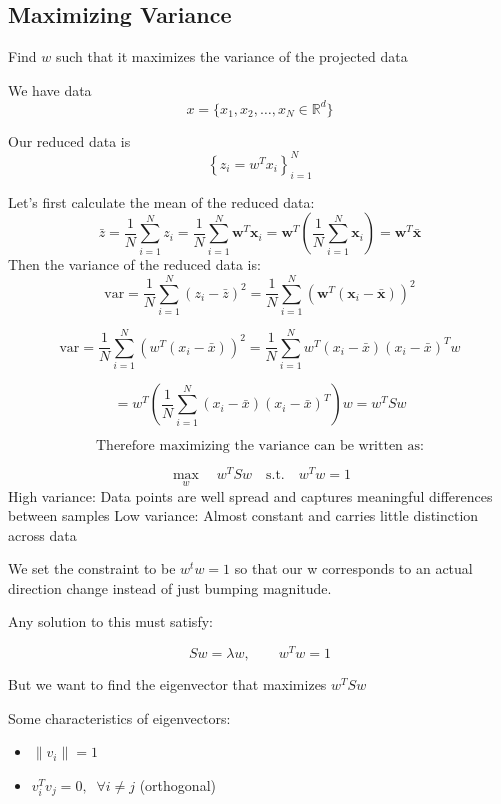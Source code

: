 \documentclass[11pt]{article}
\begin{document}
\subsection*{Maximizing Variance}

Find $w$ such that it maximizes the variance of the projected data

We have data
\[
	x = \{x_1, x_2,\dots, x_N\in \mathbb{R}^d\}
\]

Our reduced data is
\[
	\left\{ z_i =w^Tx_i \right\}_{i=1}^{N}
\]


Let’s first calculate the mean of the reduced data:
\[
	\bar{z} = \frac{1}{N} \sum_{i=1}^{N} z_i
	= \frac{1}{N} \sum_{i=1}^{N} \mathbf{w}^T \mathbf{x}_i
	= \mathbf{w}^T \left( \frac{1}{N} \sum_{i=1}^{N} \mathbf{x}_i \right)
	= \mathbf{w}^T \bar{\mathbf{x}}
\]
Then the variance of the reduced data is:
\[
	\mathrm{var} = \frac{1}{N} \sum_{i=1}^{N} (z_i - \bar{z})^2
	= \frac{1}{N} \sum_{i=1}^{N} \left( \mathbf{w}^T (\mathbf{x}_i - \bar{\mathbf{x}}) \right)^2
\]

\[
	\text{var} = \frac{1}{N} \sum_{i=1}^{N} \left(w^T(x_i - \bar{x})\right)^2
	= \frac{1}{N} \sum_{i=1}^{N} w^T(x_i - \bar{x})(x_i - \bar{x})^T w
\]

\[
	= w^T \left( \frac{1}{N} \sum_{i=1}^{N} (x_i - \bar{x})(x_i - \bar{x})^T \right) w
	= w^T S w
\]

\[
	\text{Therefore maximizing the variance can be written as:}
\]

\[
	\max_{w} \quad w^T S w \quad \text{s.t.} \quad w^T w = 1
\]
High variance: Data points are well spread and captures meaningful differences between samples
Low variance: Almost constant and carries little distinction across data

\medskip

We set the constraint to be $w^tw = 1$ so that our w corresponds to an actual direction change instead of just bumping magnitude.

Any solution to this must satisfy:

\[
	S w = \lambda w, \qquad w^T w = 1
\]

\medskip

But we want to find the eigenvector that maximizes $w^T S w$

\pagebreak

Some characteristics of eigenvectors:
\begin{itemize}
	\item $\|v_i\| = 1$
	\item $v_i^T v_j = 0,\;\; \forall i \ne j$ \quad (orthogonal)
\end{itemize}
\end{document}
